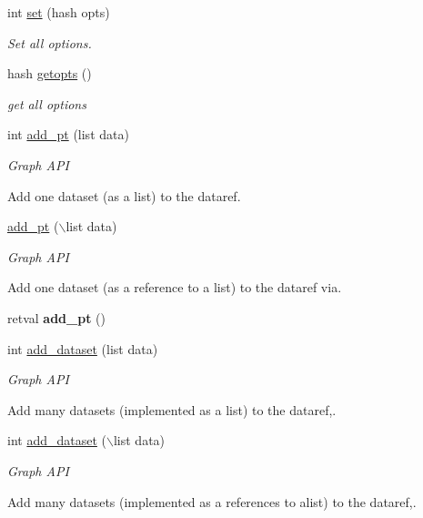  \begin{DoxyCompactItemize}
\item 
int \hyperlink{classChart_1_1Base_aadd99033eae9eab891cc2abdf7e4b74d}{set} (hash opts)
\begin{DoxyCompactList}\small\item\em Set all options. \item\end{DoxyCompactList}\item 
hash \hyperlink{classChart_1_1Base_a91b33c2a7d570aac658b2660a4d7b809}{getopts} ()
\begin{DoxyCompactList}\small\item\em get all options \item\end{DoxyCompactList}\item 
int \hyperlink{classChart_1_1Base_ac68c2d5654211e9e5c36674324fe0451}{add\_\-pt} (list data)
\begin{DoxyCompactList}\small\item\em Graph API\par
 Add one dataset (as a list) to the dataref. \item\end{DoxyCompactList}\item 
\hyperlink{classChart_1_1Base_a080e4b93239edf6886745c59506c14e5}{add\_\-pt} ($\backslash$list data)
\begin{DoxyCompactList}\small\item\em Graph API\par
 Add one dataset (as a reference to a list) to the dataref via. \item\end{DoxyCompactList}\item 
\hypertarget{classChart_1_1Base_a1e5c4d17a66458070368d3f68b542c3e}{
retval {\bfseries add\_\-pt} ()}
\label{classChart_1_1Base_a1e5c4d17a66458070368d3f68b542c3e}

\item 
int \hyperlink{classChart_1_1Base_a43dcf87aa2b9fd362ba104923c3f3d51}{add\_\-dataset} (list data)
\begin{DoxyCompactList}\small\item\em Graph API\par
 Add many datasets (implemented as a list) to the dataref,. \item\end{DoxyCompactList}\item 
int \hyperlink{classChart_1_1Base_aa56e6de915dcdc29d00f66d9326b6503}{add\_\-dataset} ($\backslash$list data)
\begin{DoxyCompactList}\small\item\em Graph API\par
 Add many datasets (implemented as a references to alist) to the dataref,. \item\end{DoxyCompactList}\end{DoxyCompactItemize}
